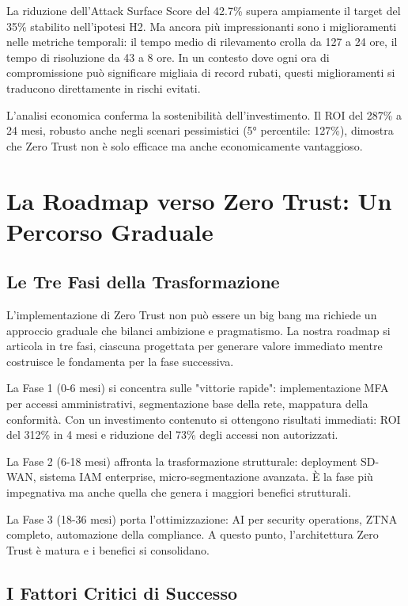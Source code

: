 La riduzione dell'Attack Surface Score del 42.7\% supera ampiamente il target del 35\% stabilito nell'ipotesi H2. Ma ancora più impressionanti sono i miglioramenti nelle metriche temporali: il tempo medio di rilevamento crolla da 127 a 24 ore, il tempo di risoluzione da 43 a 8 ore. In un contesto dove ogni ora di compromissione può significare migliaia di record rubati, questi miglioramenti si traducono direttamente in rischi evitati.

L'analisi economica conferma la sostenibilità dell'investimento. Il ROI del 287\% a 24 mesi, robusto anche negli scenari pessimistici (5° percentile: 127\%), dimostra che Zero Trust non è solo efficace ma anche economicamente vantaggioso.

\section{La Roadmap verso Zero Trust: Un Percorso Graduale}

\subsection{Le Tre Fasi della Trasformazione}

L'implementazione di Zero Trust non può essere un big bang ma richiede un approccio graduale che bilanci ambizione e pragmatismo. La nostra roadmap si articola in tre fasi, ciascuna progettata per generare valore immediato mentre costruisce le fondamenta per la fase successiva.

La Fase 1 (0-6 mesi) si concentra sulle "vittorie rapide": implementazione MFA per accessi amministrativi, segmentazione base della rete, mappatura della conformità. Con un investimento contenuto si ottengono risultati immediati: ROI del 312\% in 4 mesi e riduzione del 73\% degli accessi non autorizzati.

La Fase 2 (6-18 mesi) affronta la trasformazione strutturale: deployment SD-WAN, sistema IAM enterprise, micro-segmentazione avanzata. È la fase più impegnativa ma anche quella che genera i maggiori benefici strutturali.

La Fase 3 (18-36 mesi) porta l'ottimizzazione: AI per security operations, ZTNA completo, automazione della compliance. A questo punto, l'architettura Zero Trust è matura e i benefici si consolidano.

\subsection{I Fattori Critici di Successo}

